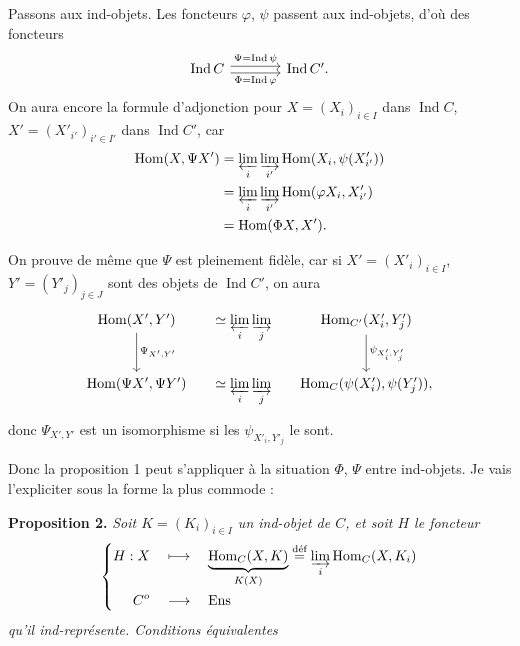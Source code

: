 \documentclass[11pt]{article}
\newcommand{\msp}[1]{\marginpar{\footnotesize [#1]}}
\newcommand{\Hom}{\operatorname{Hom}}
\newcommand{\Ind}{\operatorname{Ind}}
\newcommand{\Ens}{\mathrm{Ens}}
\begin{document}
Passons aux ind-objets. Les foncteurs $\varphi$, $\psi$ passent aux ind-objets, d'où des foncteurs
\[
\begin{tikzcd}[column sep=large]
\Ind C \arrow[r,shift left,"\Psi = \Ind\psi"] \arrow[r,shift right,"\Phi = \Ind\varphi"'] & \Ind C'.
\end{tikzcd} %
\]
On aura encore la formule d'adjonction pour $X = (X_i)_{i\in I}$ dans $\Ind C$, $X' = (X'_{i'})_{i'\in I'}$ dans $\Ind C'$, car
\[
\begin{aligned}
\Hom(X,\Psi X') &= \varprojlim_i \varinjlim_{i'} \Hom(X_i,\psi(X'_{i'}))\\
&= \varprojlim_i \varinjlim_{i'} \Hom(\varphi X_i,X'_{i'})\\
&= \Hom(\Phi X,X').
\end{aligned}
\]

\noindent\msp{page 41}%
On prouve de même que $\Psi$ est pleinement fidèle, car si $X' = (X'_i)_{i\in I}$, $Y' = (Y'_j)_{j\in J}$ sont des objets de $\Ind C'$, on aura
\[
\begin{tikzcd}[column sep=small]
\Hom(X',Y') \arrow[d,"\Psi_{X',Y'}"] & \simeq \varprojlim\limits_i \varinjlim\limits_j & \Hom_{C'}(X'_i,Y'_j) \arrow[d,"\psi_{X'_i,Y'_j}"] \\
\Hom(\Psi X',\Psi Y') & \simeq \varprojlim\limits_i \varinjlim\limits_j & \Hom_C(\psi(X'_i),\psi(Y'_j)),
\end{tikzcd}
\]
donc $\Psi_{X',Y'}$ est un isomorphisme si les $\psi_{X'_i,Y'_j}$ le sont.

Donc la proposition 1 peut s'appliquer à la situation $\Phi$, $\Psi$ entre ind-objets. Je vais l'expliciter sous la forme la plus commode :

\textbf{Proposition 2.} \textit{Soit $K = (K_i)_{i\in I}$ un ind-objet de $C$, et soit $H$ le foncteur}
\[
\left\{
\begin{aligned}
H : X \quad &\longmapsto \quad \underbrace{\Hom_C(X,K)}_{K(X)} \overset{\text{déf}}{=} \varinjlim_i \Hom_C(X,K_i)\\
C^o \quad &\longrightarrow \quad \Ens
\end{aligned}
\right.
\]
\textit{qu'il ind-représente. Conditions équivalentes}
\end{document}
